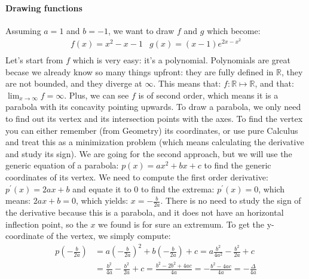 \paragraph[Problem 3]{Drawing functions}
\label{par:subp3_1}
Assuming $a = 1$ and $b = -1$, we want to draw $f$ and $g$ which become:
\begin{equation*}
    \begin{array}{cc}
        f(x) = x^2 - x -1 & g(x) = (x - 1)e^{2x - x^2} \\
    \end{array}
\end{equation*}
Let's start from $f$ which is very easy: it's a polynomial. Polynomials
are great becase we already know so many things upfront: they are
fully defined in $\mathbb{R}$, they are not
bounded,
and they diverge at $\infty$. This means
that: $f : \mathbb{R} \mapsto \mathbb{R}$, and that:
$\lim_{x \to \infty} f = \infty$. Plus, we can see $f$ is of second order,
which means it is a parabola with its concavity pointing
upwards. To draw a parabola, we only need
to find out its vertex and its intersection points with the axes.
To find the vertex you can either remember (from Geometry) its coordinates,
or use pure Calculus and treat this as a
minimization problem (which means calculating the derivative
and study its sign). We are going for the second approach, but we will use
the generic equation of a parabola: $p(x) = ax^2 + bx + c$ to
find the generic coordinates of its vertex. We need to compute the first
order derivative: $p^\prime(x) = 2ax + b$ and equate it to $0$ to find
the extrema: $p^\prime(x) = 0$, which means: $2ax + b = 0$, which yields:
$x = -\frac{b}{2a}$. There is no need to study the sign of the derivative
because this is a parabola, and it does not have an horizontal inflection
point, so the $x$ we found is for sure an extremum.
To get the y-coordinate of the vertex, we simply
compute:
\begin{equation*}
    \begin{split}
        p\left( -\frac{b}{2a} \right) &=
        a \left( -\frac{b}{2a} \right)^2 + b \left( -\frac{b}{2a} \right) + c =
        a \frac{b^2}{4a^2} - \frac{b^2}{2a} + c\\
        &= \frac{b^2}{4a} - \frac{b^2}{2a} + c = \frac{b^2 - 2b^2 + 4ac}{4a} =
        - \frac{b^2 - 4ac}{4a} = - \frac{\Delta}{4a}
    \end{split}
\end{equation*}
